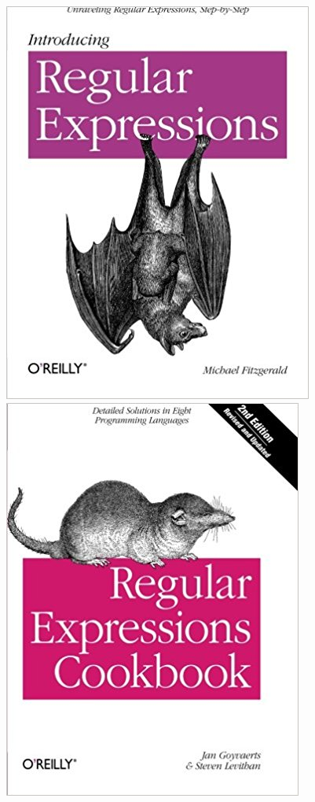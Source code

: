 \documentclass[pdftex,aspectratio=169]{beamer}
\begin{document}
\begin{frame}
  \begin{center}
    \includegraphics[scale=0.25]{book-introducing-regular-expressions}
    \includegraphics[scale=0.25]{book-regular-expression-cookbook}

\end{center}
\end{frame}
\end{document}
